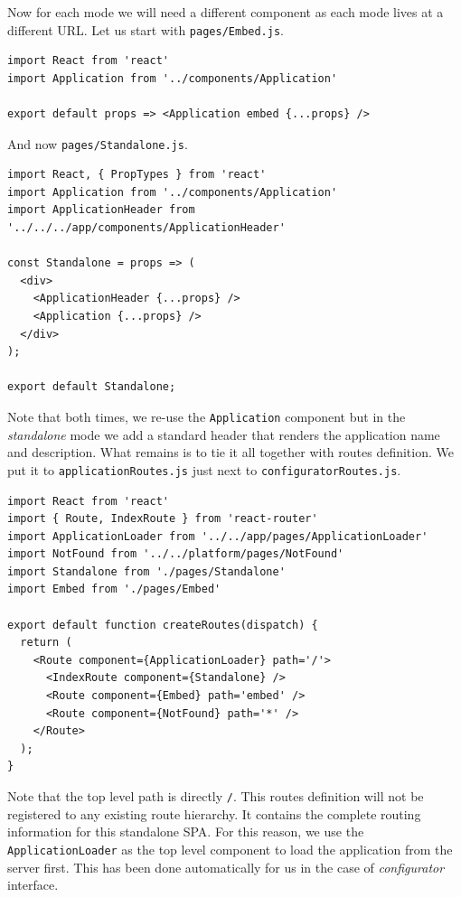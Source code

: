 Now for each mode we will need a different component as each mode lives at a different URL. Let us start with \texttt{pages/Embed.js}.

\begin{verbatim}
import React from 'react'
import Application from '../components/Application'

export default props => <Application embed {...props} />
\end{verbatim}

And now \texttt{pages/Standalone.js}.

\begin{verbatim}
import React, { PropTypes } from 'react'
import Application from '../components/Application'
import ApplicationHeader from '../../../app/components/ApplicationHeader'

const Standalone = props => (
  <div>
    <ApplicationHeader {...props} />
    <Application {...props} />
  </div>
);

export default Standalone;
\end{verbatim}

Note that both times, we re-use the \texttt{Application} component but in the \emph{standalone} mode we add a standard header that renders the application name and description. What remains is to tie it all together with routes definition. We put it to \texttt{applicationRoutes.js} just next to \texttt{configuratorRoutes.js}.

\begin{verbatim}
import React from 'react'
import { Route, IndexRoute } from 'react-router'
import ApplicationLoader from '../../app/pages/ApplicationLoader'
import NotFound from '../../platform/pages/NotFound'
import Standalone from './pages/Standalone'
import Embed from './pages/Embed'

export default function createRoutes(dispatch) {
  return (
    <Route component={ApplicationLoader} path='/'>
      <IndexRoute component={Standalone} />
      <Route component={Embed} path='embed' />
      <Route component={NotFound} path='*' />
    </Route>
  );
}
\end{verbatim}

Note that the top level path is directly \texttt{/}. This routes definition will not be registered to any existing route hierarchy. It contains the complete routing information for this standalone SPA. For this reason, we use the \texttt{ApplicationLoader} as the top level component to load the application from the server first. This has been done automatically for us in the case of \emph{configurator} interface.
 

